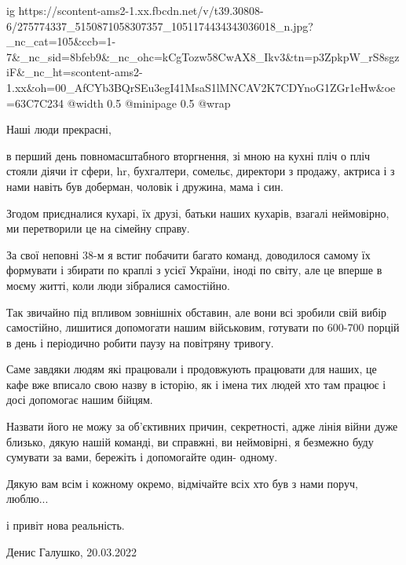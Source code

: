  
 
 
 
 

\ifcmt
  ig https://scontent-ams2-1.xx.fbcdn.net/v/t39.30808-6/275774337_5150871058307357_1051174434343036018_n.jpg?_nc_cat=105&ccb=1-7&_nc_sid=8bfeb9&_nc_ohc=kCgTozw58CwAX8_Ikv3&tn=p3ZpkpW_rS8sgziF&_nc_ht=scontent-ams2-1.xx&oh=00_AfCYb3BQrSEu3egI41MsaS1lMNCAV2K7CDYnoG1ZGr1eHw&oe=63C7C234
  @width 0.5
  @minipage 0.5
  @wrap \parpic[r]
\fi

Наші люди прекрасні,

в перший день повномасштабного вторгнення,  зі мною на кухні пліч о пліч
стояли діячи іт сфери, hr, бухгалтери, сомельє, директори з продажу, актриса і
з нами навіть був доберман, чоловік і дружина, мама і син.

Згодом приєдналися кухарі, їх друзі, батьки наших кухарів, взагалі неймовірно,
ми перетворили це на сімейну справу.

За свої неповні 38-м я встиг побачити багато команд, доводилося самому їх
формувати і збирати по краплі з усієї України, іноді по світу, але це вперше в
моєму житті, коли люди зібралися самостійно.

Так звичайно під впливом зовнішніх обставин, але вони всі зробили свій вибір
самостійно, лишитися  допомогати нашим військовим, готувати по 600-700 порцій в
день і періодично робити паузу на повітряну тривогу. 

Саме завдяки людям які працювали і продовжують працювати для наших, це кафе
вже вписало свою назву в історію, як і імена тих людей хто там працює і досі
допомогає нашим бійцям.

Назвати його не можу за об'єктивних причин, секретності, адже лінія війни дуже
близько, дякую нашій команді, ви справжні, ви неймовірні, я безмежно буду
сумувати за вами, бережіть і допомогайте один- одному.

Дякую вам всім і кожному окремо, відмічайте всіх хто був з нами поруч, люблю...

і привіт нова реальність.
\par\vspace{1cm}

Денис Галушко, 20.03.2022

